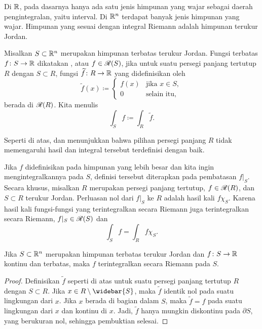 Di ${\mathbb{R}}$, pada dasarnya hanya ada satu jenis himpunan yang wajar sebagai daerah
pengintegralan, yaitu interval. Di ${\mathbb{R}}^n$ terdapat banyak jenis himpunan yang
wajar. Himpunan yang sesuai dengan integral Riemann adalah himpunan terukur
Jordan.

\begin{defn}
Misalkan $S \subset {\mathbb{R}}^n$ merupakan himpunan terbatas terukur Jordan.
Fungsi terbatas $f \colon S \to {\mathbb{R}}$ dikatakan
\emph{}%
, atau
$f \in {\mathscr{R}}(S)$, jika untuk suatu persegi panjang tertutup $R$ dengan
$S \subset R$, fungsi $\widetilde{f} \colon R \to {\mathbb{R}}$ yang didefinisikan oleh
\begin{equation*}
\widetilde{f}(x) \coloneqq
\begin{cases}
f(x) & \text{jika } x \in S, \\
0 & \text{selain itu},
\end{cases}
\end{equation*}
berada di ${\mathscr{R}}(R)$. Kita menulis
%
\begin{equation*}
\int_S f \coloneqq \int_R \widetilde{f}.
\end{equation*}
\end{defn}

Seperti di atas,  dan
 menunjukkan bahwa pilihan persegi panjang $R$
tidak memengaruhi hasil dan integral tersebut terdefinisi dengan baik.

Jika $f$ didefinisikan pada himpunan yang lebih besar dan kita ingin
mengintegralkannya pada $S$, definisi tersebut diterapkan pada pembatasan
$f|_S$. Secara khusus, misalkan $R$ merupakan persegi panjang tertutup,
$f \in {\mathscr{R}}(R)$, dan $S \subset R$ terukur Jordan. Perluasan nol dari $f|_S$
ke $R$ adalah hasil kali $f\chi_S$. Karena hasil kali fungsi-fungsi yang
terintegralkan secara Riemann juga terintegralkan secara Riemann,
$f|_S \in {\mathscr{R}}(S)$ dan
\begin{equation*}
\int_S f = \int_R f \chi_S .
\end{equation*}

\begin{prop}
Jika $S \subset {\mathbb{R}}^n$ merupakan himpunan terbatas terukur Jordan dan
$f \colon S \to {\mathbb{R}}$ kontinu dan terbatas, maka $f$ terintegralkan secara
Riemann pada $S$.
\end{prop}

\begin{proof}
Definisikan $\widetilde{f}$ seperti di atas untuk suatu persegi panjang
tertutup $R$ dengan $S \subset R$. Jika
$x \in R \setminus \widebar{S}$, maka $\widetilde{f}$ identik nol pada suatu
lingkungan dari $x$. Jika $x$ berada di bagian dalam $S$, maka
$\widetilde{f}=f$ pada suatu lingkungan dari $x$ dan kontinu di $x$. Jadi,
$\widetilde{f}$ hanya mungkin diskontinu pada $\partial S$, yang berukuran nol,
sehingga pembuktian selesai.
\end{proof}

